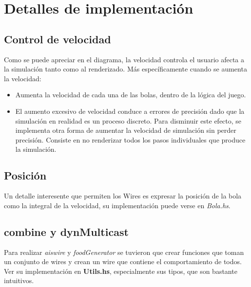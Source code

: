 \documentclass[12pt]{article}
\begin{document}
\section{Detalles de implementación}
\subsection{Control de velocidad}
Como se puede apreciar en el diagrama, la velocidad controla el usuario afecta a la simulación tanto como al renderizado. Más específicamente cuando se aumenta la velocidad:
\begin{itemize}
\item Aumenta la velocidad de cada una de las bolas, dentro de la lógica del juego.
\item El aumento excesivo de velocidad conduce a errores de precisión dado que la simulación en realidad es un proceso discreto. Para disminuir este efecto, se implementa otra forma de aumentar la velocidad de simulación sin perder precisión. Consiste en no renderizar todos los pasos individuales que produce la simulación. 
\end{itemize} 
\subsection{Posición}
Un detalle interesente que permiten los Wires es expresar la posición de la bola como la integral de la velocidad, su implementación puede verse en \emph{Bola.hs}.
\subsection{combine y dynMulticast}
Para realizar \emph{aiswire} y \emph{foodGenerator} se tuvieron que crear funciones que toman un conjunto de wires y crean un wire que contiene el comportamiento de todos. Ver su implementación en \textbf{Utils.hs}, especialmente sus tipos, que son bastante intuitivos.
\end{document}
